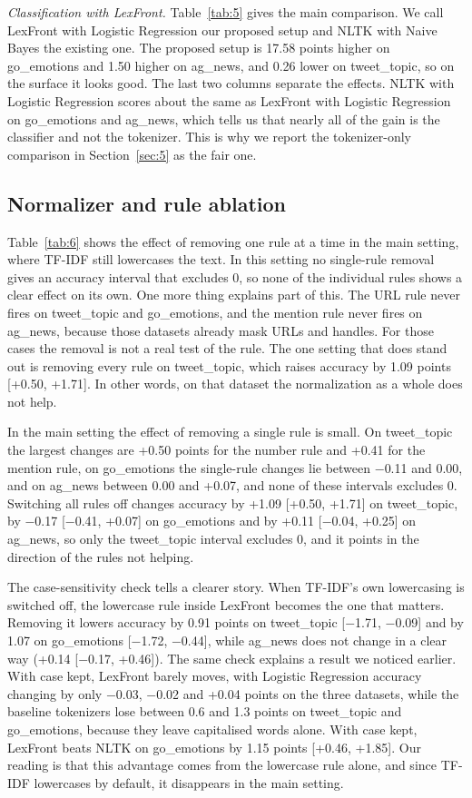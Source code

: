 \documentclass[journal,a4paper]{IEEEtran}
\begin{document}
\par\noindent\textit{Classification with LexFront.}
Table~\ref{tab:5} gives the main comparison. We call LexFront with Logistic Regression our proposed setup and NLTK with Naive Bayes the existing one. The proposed setup is 17.58 points higher on go\_emotions and 1.50 higher on ag\_news, and 0.26 lower on tweet\_topic, so on the surface it looks good. The last two columns separate the effects. NLTK with Logistic Regression scores about the same as LexFront with Logistic Regression on go\_emotions and ag\_news, which tells us that nearly all of the gain is the classifier and not the tokenizer. This is why we report the tokenizer-only comparison in Section~\ref{sec:5} as the fair one.

\subsection{Normalizer and rule ablation}\label{sec:4.4}
Table~\ref{tab:6} shows the effect of removing one rule at a time in the main setting, where TF-IDF still lowercases the text. In this setting no single-rule removal gives an accuracy interval that excludes 0, so none of the individual rules shows a clear effect on its own. One more thing explains part of this. The URL rule never fires on tweet\_topic and go\_emotions, and the mention rule never fires on ag\_news, because those datasets already mask URLs and handles. For those cases the removal is not a real test of the rule. The one setting that does stand out is removing every rule on tweet\_topic, which raises accuracy by 1.09 points [+0.50, +1.71]. In other words, on that dataset the normalization as a whole does not help.

In the main setting the effect of removing a single rule is small. On tweet\_topic the largest changes are +0.50 points for the number rule and +0.41 for the mention rule, on go\_emotions the single-rule changes lie between $-$0.11 and 0.00, and on ag\_news between 0.00 and +0.07, and none of these intervals excludes 0. Switching all rules off changes accuracy by +1.09 [+0.50, +1.71] on tweet\_topic, by $-$0.17 [$-$0.41, +0.07] on go\_emotions and by +0.11 [$-$0.04, +0.25] on ag\_news, so only the tweet\_topic interval excludes 0, and it points in the direction of the rules not helping.

The case-sensitivity check tells a clearer story. When TF-IDF's own lowercasing is switched off, the lowercase rule inside LexFront becomes the one that matters. Removing it lowers accuracy by 0.91 points on tweet\_topic [$-$1.71, $-$0.09] and by 1.07 on go\_emotions [$-$1.72, $-$0.44], while ag\_news does not change in a clear way (+0.14 [$-$0.17, +0.46]). The same check explains a result we noticed earlier. With case kept, LexFront barely moves, with Logistic Regression accuracy changing by only $-$0.03, $-$0.02 and +0.04 points on the three datasets, while the baseline tokenizers lose between 0.6 and 1.3 points on tweet\_topic and go\_emotions, because they leave capitalised words alone. With case kept, LexFront beats NLTK on go\_emotions by 1.15 points [+0.46, +1.85]. Our reading is that this advantage comes from the lowercase rule alone, and since TF-IDF lowercases by default, it disappears in the main setting.
\end{document}
